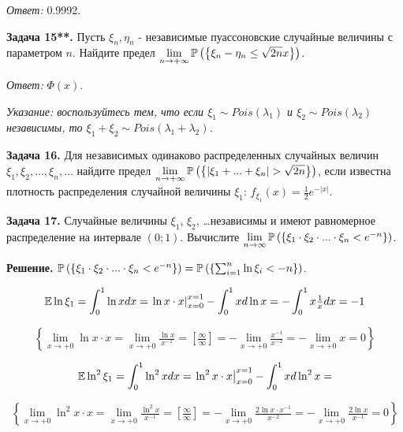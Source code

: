 \textit{Ответ: }0.9992.



\textbf{Задача 15**. }Пусть $\xi _{n} ,\eta _{n} $ - независимые пуассоновские случайные величины с параметром $n$. Найдите предел $\mathop{\lim }\limits_{n\to +\infty } {\rm {\mathbb P}}\left(\left\{\xi _{n} -\eta _{n} \le \sqrt{2n} x\right\}\right)$.

\textit{Ответ: }$\Phi (x)$.

\textit{Указание: воспользуйтесь тем, что если $\xi _{1} \sim Pois\left(\lambda _{1} \right)$ и $\xi _{2} \sim Pois\left(\lambda _{2} \right)$ независимы, то $\xi _{1} +\xi _{2} \sim Pois\left(\lambda _{1} +\lambda _{2} \right)$.}

\textbf{Задача 16. }Для независимых одинаково распределенных случайных величин $\xi _{1} ,\xi _{2} ,...,\xi _{n} ,...$ найдите предел $\mathop{\lim }\limits_{n\to +\infty } {\rm {\mathbb P}}\left(\left\{\left|\xi _{1} +...+\xi _{n} \right|>\sqrt{2n} \right\}\right)$, если известна плотность распределения случайной величины $\xi _{1} $: $f_{\xi _{1} } \left(x\right)=\frac{1}{2} e^{-\left|x\right|} $. 

 

\textbf{Задача 17. }Случайные величины $\xi _{1} $, $\xi _{2} $, \dots  независимы и имеют равномерное распределение на интервале $\left(0;1\right)$. Вычислите $\mathop{\lim }\limits_{n\to \infty } {\rm {\mathbb P}}\left(\left\{\xi _{1} \cdot \xi _{2} \cdot ...\cdot \xi _{n} <e^{-n} \right\}\right)$. 

\textbf{Решение. }${\rm {\mathbb P}}\left(\left\{\xi _{1} \cdot \xi _{2} \cdot ...\cdot \xi _{n} <e^{-n} \right\}\right)={\rm {\mathbb P}}\left(\left\{\sum _{i=1}^{n}\ln \xi _{i}  <-n\right\}\right)$. 

\[{\rm {\mathbb E}}\ln \xi _{1} =\int _{0}^{1}\ln xdx =\left. \ln x\cdot x\right|_{x=0}^{x=1} -\int _{0}^{1}xd\ln x =-\int _{0}^{1}x{\tfrac{1}{x}} dx =-1\] 

\[\left\{\mathop{\lim }\limits_{x\to +0} \ln x\cdot x=\mathop{\lim }\limits_{x\to +0} {\tfrac{\ln x}{x^{-1} }} =\left[{\tfrac{\infty }{\infty }} \right]=-\mathop{\lim }\limits_{x\to +0} {\tfrac{x^{-1} }{x^{-2} }} =-\mathop{\lim }\limits_{x\to +0} x=0\right\}\] 

\[{\rm {\mathbb E}}\ln ^{2} \xi _{1} =\int _{0}^{1}\ln ^{2} xdx =\left. \ln ^{2} x\cdot x\right|_{x=0}^{x=1} -\int _{0}^{1}xd\ln ^{2} x =\] 

\[\left\{\mathop{\lim }\limits_{x\to +0} \ln ^{2} x\cdot x=\mathop{\lim }\limits_{x\to +0} {\tfrac{\ln ^{2} x}{x^{-1} }} =\left[{\tfrac{\infty }{\infty }} \right]=-\mathop{\lim }\limits_{x\to +0} {\tfrac{2\ln x\cdot x^{-1} }{x^{-2} }} =-\mathop{\lim }\limits_{x\to +0} {\tfrac{2\ln x}{x^{-1} }} =0\right\}\] 

